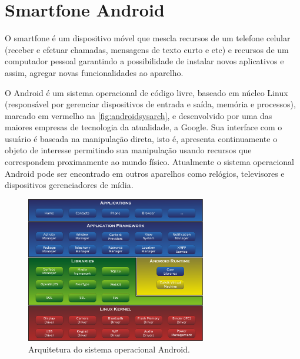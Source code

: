 \section{Smartfone Android}
\label{sec:android}

O smartfone é um dispositivo móvel que mescla recursos de um telefone celular (receber e efetuar chamadas, mensagens de texto curto e etc) e recursos de um computador pessoal garantindo a possibilidade de instalar novos aplicativos e assim, agregar novas funcionalidades ao aparelho.\par

O Android é um sistema operacional de código livre, baseado em núcleo Linux (responsável por gerenciar dispositivos de entrada e saída, memória e processos), marcado em vermelho na \autoref{fig:androidsysarch}, e desenvolvido por uma das maiores empresas de tecnologia da atualidade, a Google.  Sua interface com o usuário é baseada na manipulação direta, isto é, apresenta continuamente o objeto de interesse permitindo sua manipulação usando recursos que correspondem proximamente ao mundo físico.  Atualmente o sistema operacional Android pode ser encontrado em outros aparelhos como relógios, televisores e dispositivos gerenciadores de mídia.  \par

\begin{figure}[H]
	\centering
		\includegraphics[width=0.7\textwidth]{figuras/android_sys_arch.pdf}
		\caption{Arquitetura do sistema operacional Android.}
		\label{fig:androidsysarch}
\end{figure}


